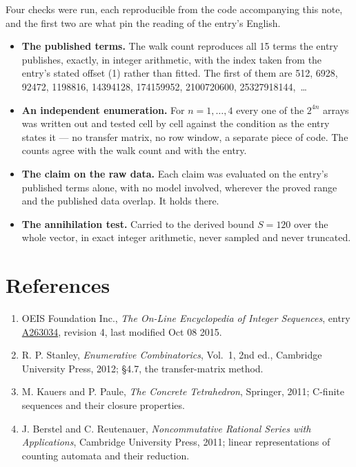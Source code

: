 \documentclass[11pt]{article}
\theoremstyle{definition}
\begin{document}
Four checks were run, each reproducible from the code accompanying this note, and the first two are what pin the reading of the entry's English.

\begin{itemize}

\item {\bfseries The published terms.} The walk count reproduces all 15 terms the entry publishes, exactly, in integer arithmetic, with the index taken from the entry's stated offset (1) rather than fitted. The first of them are 512, 6928, 92472, 1198816, 14394128, 174159952, 2100720600, 25327918144,~\dots

\item {\bfseries An independent enumeration.} For $n = 1,\dots,4$ every one of the $2^{4n}$ arrays was written out and tested cell by cell against the condition as the entry states it --- no transfer matrix, no row window, a separate piece of code. The counts agree with the walk count and with the entry.

\item {\bfseries The claim on the raw data.} Each claim was evaluated on the entry's published terms alone, with no model involved, wherever the proved range and the published data overlap. It holds there.

\item {\bfseries The annihilation test.} Carried to the derived bound $S = 120$ over the whole vector, in exact integer arithmetic, never sampled and never truncated.

\end{itemize}

\section{References}

\begin{enumerate}

\item OEIS Foundation Inc., \emph{The On-Line Encyclopedia of Integer Sequences}, entry \href{https://oeis.org/A263034}{A263034}, revision 4, last modified Oct 08 2015.

\item R. P. Stanley, \emph{Enumerative Combinatorics}, Vol.~1, 2nd ed., Cambridge University Press, 2012; \S4.7, the transfer-matrix method.

\item M. Kauers and P. Paule, \emph{The Concrete Tetrahedron}, Springer, 2011; C-finite sequences and their closure properties.

\item J. Berstel and C. Reutenauer, \emph{Noncommutative Rational Series with Applications}, Cambridge University Press, 2011; linear representations of counting automata and their reduction.

\end{enumerate}
\end{document}
